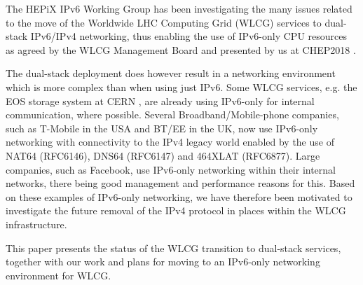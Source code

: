 

 


The HEPiX IPv6 Working Group \cite{ipv6wg} has been investigating the many issues related to the 
move of the Worldwide LHC Computing Grid (WLCG) services to dual-stack IPv6/IPv4 networking, thus enabling the use of
IPv6-only CPU resources as agreed by the WLCG Management Board and presented by us at 
CHEP2018 \cite{ipv6chep2018}. 

The dual-stack deployment does however result in a networking environment
which is more complex than when using just IPv6. Some WLCG services, e.g.
the EOS storage system at CERN \cite{eos}, are already using IPv6-only for internal communication,
where possible. Several Broadband/Mobile-phone companies, such as T-Mobile in the USA and
BT/EE in the UK, now use IPv6-only networking with connectivity to the IPv4
legacy world enabled by the use of NAT64 (RFC6146\cite{rfc}), DNS64 (RFC6147\cite{rfc}) and 464XLAT (RFC6877\cite{rfc}). Large companies, such
as Facebook, use IPv6-only networking within their internal networks, there
being good management and performance reasons for this. Based on these examples
of IPv6-only networking, we have therefore been motivated to investigate the future removal of the IPv4 protocol in
places within the WLCG infrastructure.

This paper presents the status of the WLCG transition to dual-stack services, together with 
our work and plans for moving to an IPv6-only networking environment for WLCG.


